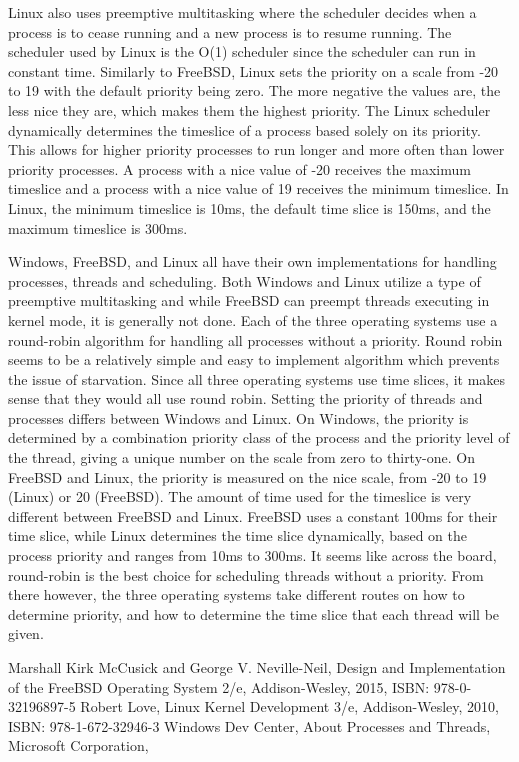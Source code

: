 \documentclass[letterpaper,10pt,draftclsnofoot,onecolumn,titlepage]{IEEEtran}
\begin{document}
		\par
		Linux also uses preemptive multitasking where the scheduler decides when a process is to cease running and a new process is to resume running. The scheduler used by Linux is the O(1) scheduler since the scheduler can run in constant time. Similarly to FreeBSD, Linux sets the priority on a scale from -20 to 19 with the default priority being zero. The more negative the values are, the less nice they are, which makes them the highest priority. The Linux scheduler dynamically determines the timeslice of a process based solely on its priority. This allows for higher priority processes to run longer and more often than lower priority processes. A process with a nice value of {-20} receives the maximum timeslice and a process with a nice value of 19 receives the minimum timeslice. In Linux, the minimum timeslice is 10ms, the default time slice is 150ms, and the maximum timeslice is 300ms.
		\par
		Windows, FreeBSD, and Linux all have their own implementations for handling processes, threads and scheduling. Both Windows and Linux utilize a type of preemptive multitasking and while FreeBSD can preempt threads executing in kernel mode, it is generally not done. Each of the three operating systems use a round-robin algorithm for handling all processes without a priority. Round robin seems to be a relatively simple and easy to implement algorithm which prevents the issue of starvation. Since all three operating systems use time slices, it makes sense that they would all use round robin. Setting the priority of threads and processes differs between Windows and Linux. On Windows, the priority is determined by a combination priority class of the process and the priority level of the thread, giving a unique number on the scale from zero to thirty-one. On FreeBSD and Linux, the priority is measured on the nice scale, from -20 to 19 (Linux) or 20 (FreeBSD). The amount of time used for the timeslice is very different between FreeBSD and Linux. FreeBSD uses a constant 100ms for their time slice, while Linux determines the time slice dynamically, based on the process priority and ranges from 10ms to 300ms. It seems like across the board, round-robin is the best choice for scheduling threads without a priority. From there however, the three operating systems take different routes on how to determine priority, and how to determine the time slice that each thread will be given.

	\begin{thebibliography}{3}
			Marshall Kirk McCusick and George V. Neville-Neil,
			Design and Implementation of the FreeBSD Operating System 2/e,
			Addison-Wesley,
			2015,
			ISBN: 978-0-32196897-5
			Robert Love,
			Linux Kernel Development 3/e,
			Addison-Wesley,
			2010,
			ISBN: 978-1-672-32946-3
			Windows Dev Center,
			About Processes and Threads,
			Microsoft Corporation,
	\end{thebibliography}
\end{document}
